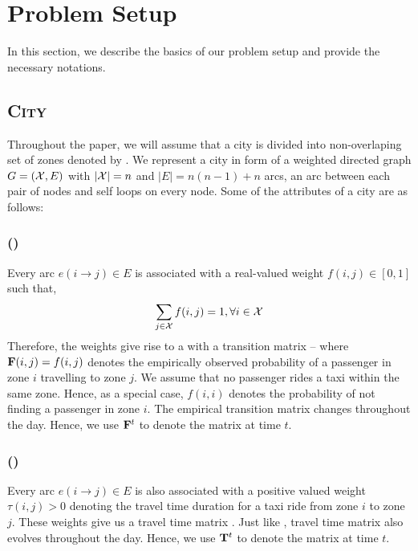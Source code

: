 
\section{Problem Setup}
\label{sec:problem_setup}

In this section, we describe the basics of our problem setup and provide the necessary notations.

\subsection{\textsc{City}}

Throughout the paper, we will assume that a city is divided into non-overlaping set of zones denoted by \cityzones. 
We represent a city in form of a weighted directed graph $G=(\mathcal{X}, E)$ with 
$|\mathcal{X}| = n$ and $|E| = n(n-1) + n$ arcs, an arc between each pair of nodes and self loops on every node. 
Some of the attributes of a city are as follows:

\subsubsection{ (\empiricaltransitionmatrix)}

Every arc $e(i\rightarrow j) \in E$ is associated with a real-valued weight $f(i,j) \in [0,1]$ such that,
\begin{equation}
	\sum_{j \in \mathcal{X}} f(i,j) = 1, \forall i \in \mathcal{X}
\end{equation}
Therefore, the weights give rise to a {\markovchain} with a transition matrix {\empiricaltransitionmatrix} -- 
where ${\mathbf{F}}(i,j) = f(i,j)$ 
denotes the empirically observed probability of a passenger in zone $i$
travelling to zone $j$. We assume that no passenger rides a taxi within the same zone. Hence, as a special case, 
$f(i,i)$ denotes the probability of not finding a passenger in zone $i$. The empirical transition matrix \empiricaltransitionmatrix
changes throughout the day. Hence, we use ${\mathbf{F}}^t$ to denote the matrix at time $t$.

\subsubsection{ (\traveltimematrix)}

Every arc $e(i\rightarrow j) \in E$ is also associated with a positive valued weight $\tau(i,j) > 0$ 
denoting the travel time duration for a taxi ride from zone $i$ to zone $j$. 
These weights give us a travel time matrix \traveltimematrix. 
Just like {\empiricaltransitionmatrix},  travel time matrix also evolves throughout the day. 
Hence, we use ${\mathbf{T}}^t$ to denote the matrix at time $t$.

